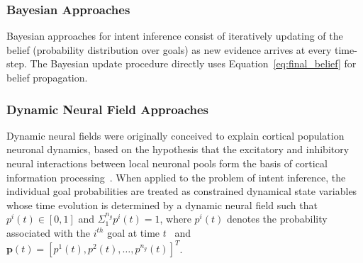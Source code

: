 \documentclass[conference]{IEEEtran}
\begin{document}
\subsubsection{Bayesian Approaches}
Bayesian approaches for intent inference consist of iteratively updating of the belief (probability distribution over goals) as new evidence arrives at every time-step. The Bayesian update procedure directly uses Equation~\ref{eq:final_belief} for belief propagation. 


\subsubsection{Dynamic Neural Field Approaches}
Dynamic neural fields were originally conceived to explain cortical population neuronal dynamics, based on the hypothesis that the excitatory and inhibitory neural interactions between local neuronal pools form the basis of cortical information processing~\citep{schoner2008dynamical}. 
When applied to the problem of intent inference, the individual goal probabilities are treated as constrained dynamical state variables whose time evolution is determined by a dynamic neural field such that $p^i(t) \in [0, 1]$ and $\Sigma_{1}^{n_g}p^{i}(t) = 1$, where $p^i(t)$ denotes the probability associated with the $i^{th}$ goal at time $t$~\citep{gopinath2017disamb} and $\boldsymbol{p}(t) = [p^1(t), p^2(t),\dots,p^{n_g}(t) ]^{T}$. 
\end{document}
